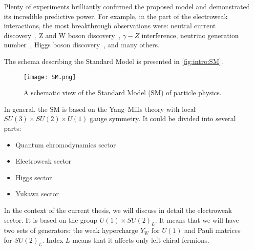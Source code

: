 \documentclass[../main.tex]{subfiles}
\begin{document}
Plenty of experiments brilliantly confirmed the proposed model and demonstrated its incredible predictive power. For example, in the part of the electroweak interactions, the most breakthrough observations were: neutral current discovery~\cite{Cundy1974}, Z and W boson discovery~\cite{Arnison1983}, $\gamma-Z$ interference, neutrino generation number~\cite{Arnison1983}, Higgs boson discovery~\cite{Aad2012}, and many others.

The schema describing the Standard Model is presented in \autoref{fig:intro:SM}.

\begin{figure}[!ht]
    \centering
    \texttt{[image: SM.png]}
    \caption{A schematic view of the Standard Model (SM) of particle physics.}
    \label{fig:intro:SM}
\end{figure}

In general, the SM is based on the Yang–Mills theory with local $SU(3)\times SU(2)\times U(1)$ gauge symmetry. It could be divided into several parts:
\begin{itemize}
  \item Quantum chromodynamics sector
  \item Electroweak sector
  \item Higgs sector
  \item Yukawa sector
\end{itemize}

In the context of the current thesis, we will discuss in detail the electroweak sector. It is based on the group $U(1)\times SU(2)_L$. It means that we will have two sets of generators: the weak hypercharge $Y_W$ for $U(1)$ and Pauli matrices for $SU(2)_L$. Index $L$ means that it affects only left-chiral fermions.
\end{document}
